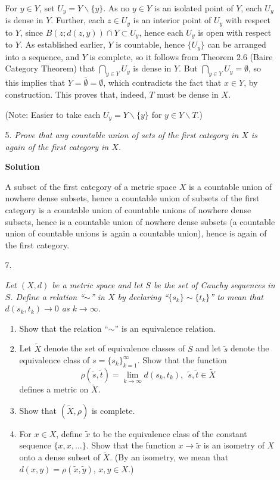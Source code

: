 \documentclass{article}
\begin{document}
\begin{enumerate}
\begin{itemize}
For \(y \in Y\), set \(U_y = Y \backslash \{y\}\).  As no \(y \in Y\) is an isolated point of \(Y\), each \(U_y\) is dense in \(Y\).  Further, each \(z \in U_y\) is an interior point of \(U_y\) with respect to \(Y\), since \(B(z; d(z,y)) \cap Y \subset U_y\), hence each \(U_y\) is open with respect to \(Y\).  As established earlier, \(Y\) is countable, hence \(\{U_y\}\) can be arranged into a sequence, and \(Y\) is complete, so it follows from Theorem 2.6 (Baire Category Theorem) that \(\bigcap_{y \in Y} U_y\) is dense in \(Y\).  But \(\bigcap_{y \in Y} U_y = \emptyset\), so this implies that \(Y = \overline{\emptyset} = \emptyset\), which contradicts the fact that \(x \in Y\), by construction.  This proves that, indeed, \(T\) must be dense in \(X\).

(Note:  Easier to take each \(U_y = Y \backslash \{y\}\) for \(y \in Y \backslash T\).)



\item[5.] {\em Prove that any countable union of sets of the first category in \(X\) is again of the first category in \(X\).}

{\bf Solution}

A subset of the first category of a metric space \(X\) is a countable union of nowhere dense subsets, hence a countable union of subsets of the first category is a countable union of countable unions of nowhere dense subsets, hence is a countable union of nowhere dense subsets (a countable union of countable unions is again a countable union), hence is again of the first category.



\item[7.] {\em Let \((X,d)\) be a metric space and let \(S\) be the set of Cauchy sequences in \(S\).  Define a relation ``\(\sim\)'' in \(X\) by declaring ``\(\{s_k\} \sim \{t_k\}\)'' to mean that \(d(s_k,t_k) \to 0\) as \(k \to \infty\).
\begin{enumerate}
\item Show that the relation ``\(\sim\)'' is an equivalence relation.
\item Let \(\tilde{X}\) denote the set of equivalence classes of \(S\) and let \(\tilde{s}\) denote the equivalence class of \(s = \{s_k\}_{k = 1}^{\infty}\).  Show that the function
\[\rho(\tilde{s}, \tilde{t}) = \lim_{k \to \infty} d(s_k, t_k), \ \ \tilde{s}, \tilde{t} \in \tilde{X}\]
defines a metric on \(\tilde{X}\).
\item Show that \((\tilde{X}, \rho)\) is complete.
\item For \(x \in X\), define \(\tilde{x}\) to be the equivalence class of the constant sequence \(\{x, x, \ldots\}\).  Show that the function \(x \to \tilde{x}\) is an isometry of \(X\) onto a dense subset of \(\tilde{X}\).  (By an isometry, we mean that \(d(x,y) = \rho(\tilde{x}, \tilde{y})\), \(x,y \in X\).)


\end{enumerate}}
\end{itemize}
\end{enumerate}
\end{document}
